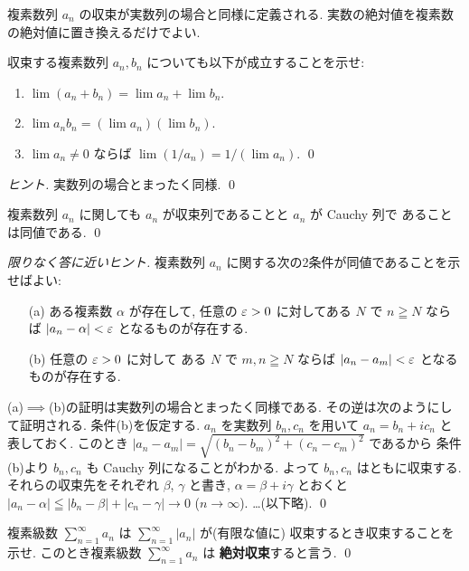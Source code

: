 \documentclass[12pt,twoside]{jarticle}
\begin{document}
複素数列 $a_n$ の収束が実数列の場合と同様に定義される.
実数の絶対値を複素数の絶対値に置き換えるだけでよい.

\begin{question}
 収束する複素数列 $a_n,b_n$ についても以下が成立することを示せ:
 \begin{enumerate}
  \item $\lim(a_n+b_n) = \lim a_n + \lim b_n$.
  \item $\lim a_n b_n = (\lim a_n)(\lim b_n)$.
  \item $\lim a_n \ne 0$ ならば $\lim(1/a_n)=1/(\lim a_n)$.
  \qed
 \end{enumerate}
\end{question}

\begin{proof}[ヒント]
 実数列の場合とまったく同様. \qed
\end{proof}

\begin{question}[$\C$ の完備性]
 複素数列 $a_n$ に関しても $a_n$ が収束列であることと $a_n$ が Cauchy 列で
 あることは同値である. \qed
\end{question}

\begin{proof}[限りなく答に近いヒント]
 複素数列 $a_n$ に関する次の2条件が同値であることを示せばよい:
 \begin{enumerate}
  \item[(a)] ある複素数 $\alpha$ が存在して, 
   任意の $\varepsilon>0$ に対してある $N$ で $n\geqq N$ ならば $|a_n-\alpha|<\varepsilon$ 
   となるものが存在する.
  \item[(b)] 任意の $\varepsilon>0$ に対して
   ある $N$ で $m,n\geqq N$ ならば $|a_n-a_m|<\varepsilon$ となるものが存在する.
 \end{enumerate}
 (a)$\implies$(b)の証明は実数列の場合とまったく同様である.
 その逆は次のようにして証明される.
 条件(b)を仮定する. $a_n$ を実数列 $b_n,c_n$ を用いて $a_n=b_n+ic_n$ と
 表しておく. このとき $|a_n-a_m|=\sqrt{(b_n-b_m)^2+(c_n-c_m)^2}$ であるから
 条件(b)より $b_n,c_n$ も Cauchy 列になることがわかる.
 よって $b_n,c_n$ はともに収束する. 
 それらの収束先をそれぞれ $\beta$, $\gamma$ 
 と書き, $\alpha=\beta+i\gamma$ とおくと %
 $|a_n-\alpha|\leqq|b_n-\beta|+|c_n-\gamma|\to 0$ ($n\to\infty$).
 …(以下略).
 \qed
\end{proof}

\begin{question}[複素級数の絶対収束]
 複素級数 $\sum_{n=1}^\infty a_n$ は $\sum_{n=1}^\infty|a_n|$ が(有限な値に)
 収束するとき収束することを示せ. このとき複素級数 $\sum_{n=1}^\infty a_n$ は
 {\bf 絶対収束}すると言う.
 \qed
\end{question}
\end{document}
